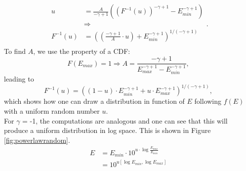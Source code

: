 \begin{appendices}
\begin{equation}
\begin{split}
u &= \frac{A}{-\gamma+1}\left(\left(F^{-1}(u)\right)^{-\gamma+1}-E_{min}^{-\gamma+1}\right)\\
&\Rightarrow \\
            F^{-1}(u) &= \left(\left(\frac{-\gamma+1}{A}\cdot u\right)+ E_{min}^{-\gamma+1}\right)^{1/(-\gamma+1)}\\
\end{split}.
\end{equation}
To find $A$, we use the property of a CDF:
\begin{equation}
F(E_{max}) = 1\Rightarrow A = \frac{-\gamma+1}{E_{max}^{-\gamma+1}-E_{min}^{-\gamma+1}},
\end{equation}
\noindent leading to
\begin{equation}
F^{-1}(u) = \left((1-u) \cdot E_{min}^{-\gamma+1} + u \cdot E_{max}^{-\gamma+1}\right)^{1/(-\gamma+1)},
\end{equation}
\noindent which shows how one can draw a distribution in function of $E$ following $f(E)$ with a uniform random number $u$.\\

\noindent For $\gamma$ = -1, the computations are analogous and one can see that this will produce a uniform distribution in log space. This is shown in Figure \ref{fig:powerlawrandom}.
            \begin{equation}
            \begin{split}
            E &= E_{min} \cdot 10^{u\cdot \log{\frac{E_{max}}{E_{min}}}}\\
            &= 10^{u[\log{E_{min}},\log{E_{max}}]}
\end{split}
\end{equation}
            

\end{appendices}
